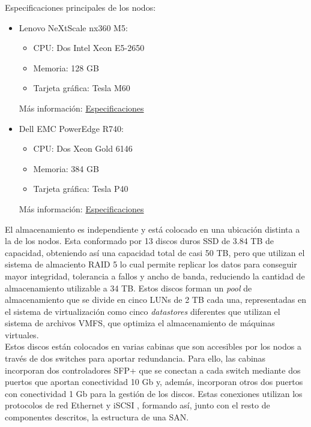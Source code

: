 Especificaciones principales de los nodos:
\begin{itemize}
    \item Lenovo NeXtScale nx360 M5: 
        \begin{itemize}
            \item CPU: Dos Intel Xeon E5-2650
            \item Memoria: 128 GB
            \item Tarjeta  gráfica: Tesla M60
        \end{itemize}
            Más información: \href{https://lenovopress.com/tips1195-nextscale-nx360-m5-e5-2600-v3}{Especificaciones}
    \item Dell EMC PowerEdge R740:
        \begin{itemize}
            \item CPU: Dos Xeon Gold 6146
            \item Memoria: 384 GB
            \item Tarjeta gráfica: Tesla P40
        \end{itemize}
    Más información: \href{https://www.dell.com/es-es/work/shop/servidores-almacenamiento-y-redes/smart-value-poweredge-r740-server-standard/spd/poweredge-r740/per7400m}{Especificaciones}
\end{itemize}
El almacenamiento es independiente y está colocado en una ubicación distinta a la de los nodos. Esta conformado por 13 discos duros SSD de 3.84 TB de capacidad, obteniendo así una capacidad total de casi 50 TB, pero que utilizan el sistema de almaciento RAID 5 lo cual permite replicar los datos para conseguir mayor  integridad, tolerancia a fallos y ancho de banda, reduciendo la cantidad de almacenamiento utilizable a 34 TB. Estos discos forman un \textit{pool} de almacenamiento que se divide en cinco LUNs de 2 TB cada una, representadas en el sistema de virtualización como cinco \textit{datastores} diferentes que utilizan el sistema de archivos VMFS, que optimiza el almacenamiento de máquinas virtuales.\\
Estos discos están colocados en varias cabinas que son accesibles por los nodos a través de dos switches para aportar redundancia. Para ello, las cabinas incorporan dos controladores SFP+ que se conectan a cada switch mediante dos puertos que aportan conectividad 10 Gb y, además, incorporan otros dos puertos con conectividad 1 Gb para la gestión de los discos. Estas conexiones utilizan los protocolos de red Ethernet y iSCSI , formando así, junto con el resto de componentes descritos, la estructura de una SAN.\\

